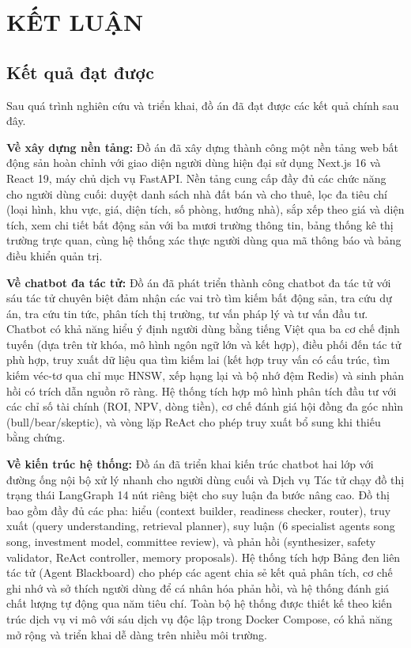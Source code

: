 \chapter*{KẾT LUẬN}

\section*{Kết quả đạt được}

Sau quá trình nghiên cứu và triển khai, đồ án đã đạt được các kết quả chính sau đây.

\textbf{Về xây dựng nền tảng:} Đồ án đã xây dựng thành công một nền tảng web bất động sản hoàn chỉnh với giao diện người dùng hiện đại sử dụng Next.js 16 và React 19, máy chủ dịch vụ FastAPI. Nền tảng cung cấp đầy đủ các chức năng cho người dùng cuối: duyệt danh sách nhà đất bán và cho thuê, lọc đa tiêu chí (loại hình, khu vực, giá, diện tích, số phòng, hướng nhà), sắp xếp theo giá và diện tích, xem chi tiết bất động sản với ba mươi trường thông tin, bảng thống kê thị trường trực quan, cùng hệ thống xác thực người dùng qua mã thông báo và bảng điều khiển quản trị.

\textbf{Về chatbot đa tác tử:} Đồ án đã phát triển thành công chatbot đa tác tử với sáu tác tử chuyên biệt đảm nhận các vai trò tìm kiếm bất động sản, tra cứu dự án, tra cứu tin tức, phân tích thị trường, tư vấn pháp lý và tư vấn đầu tư. Chatbot có khả năng hiểu ý định người dùng bằng tiếng Việt qua ba cơ chế định tuyến (dựa trên từ khóa, mô hình ngôn ngữ lớn và kết hợp), điều phối đến tác tử phù hợp, truy xuất dữ liệu qua tìm kiếm lai (kết hợp truy vấn có cấu trúc, tìm kiếm véc-tơ qua chỉ mục HNSW, xếp hạng lại và bộ nhớ đệm Redis) và sinh phản hồi có trích dẫn nguồn rõ ràng. Hệ thống tích hợp mô hình phân tích đầu tư với các chỉ số tài chính (ROI, NPV, dòng tiền), cơ chế đánh giá hội đồng đa góc nhìn (bull/bear/skeptic), và vòng lặp ReAct cho phép truy xuất bổ sung khi thiếu bằng chứng.

\textbf{Về kiến trúc hệ thống:} Đồ án đã triển khai kiến trúc chatbot hai lớp với đường ống nội bộ xử lý nhanh cho người dùng cuối và Dịch vụ Tác tử chạy đồ thị trạng thái LangGraph 14 nút riêng biệt cho suy luận đa bước nâng cao. Đồ thị bao gồm đầy đủ các pha: hiểu (context builder, readiness checker, router), truy xuất (query understanding, retrieval planner), suy luận (6 specialist agents song song, investment model, committee review), và phản hồi (synthesizer, safety validator, ReAct controller, memory proposals). Hệ thống tích hợp Bảng đen liên tác tử (Agent Blackboard) cho phép các agent chia sẻ kết quả phân tích, cơ chế ghi nhớ và sở thích người dùng để cá nhân hóa phản hồi, và hệ thống đánh giá chất lượng tự động qua năm tiêu chí. Toàn bộ hệ thống được thiết kế theo kiến trúc dịch vụ vi mô với sáu dịch vụ độc lập trong Docker Compose, có khả năng mở rộng và triển khai dễ dàng trên nhiều môi trường.

